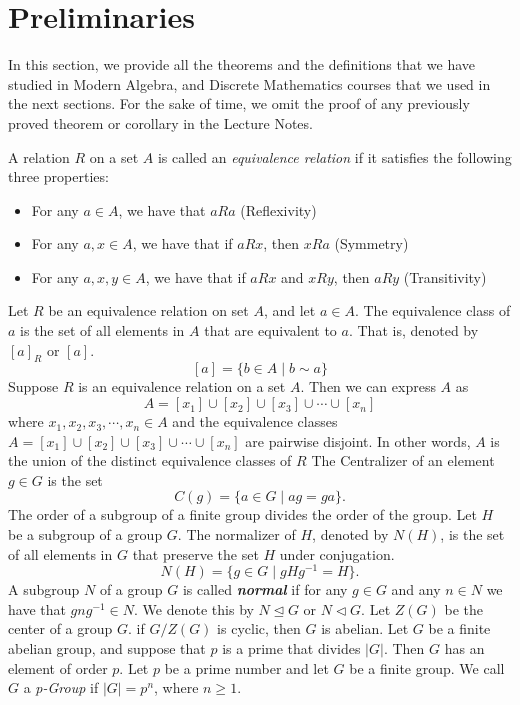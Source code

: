 \documentclass[a4paper,12pt]{article}
\begin{document}
\section{Preliminaries}
In this section, we provide all the theorems and the definitions that we have studied in Modern Algebra, and Discrete Mathematics courses that we used in the next sections. For the sake of time, we omit the proof of any previously proved theorem or corollary in the Lecture Notes.
{
    A relation $R$ on a set $A$ is called an \textit{equivalence relation} if it satisfies the following three properties:
    \begin{itemize}
        \item For any $a \in A$, we have that $aRa$ (Reflexivity)
        \item For any $a,x \in A$, we have that if $aRx$, then $xRa$ (Symmetry)
        \item For any $a,x,y \in A$, we have that if $aRx$ and $xRy$, then $aRy$ (Transitivity)
    \end{itemize}
}
{
    Let $R$ be an equivalence relation on set $A$, and let $a \in A$. The equivalence class of $a$ is the set of all elements in $A$ that are equivalent to $a.$ That is, denoted by $[a]_R$ or $[a].$
    \[[a]=\{b \in A \mid b \sim a\}\]
}
{
    Suppose $R$ is an equivalence relation on a set $A$. Then we can express $A$ as
    \[A=[x_1]\cup [x_2]\cup [x_3] \cup \cdots \cup [x_n]\]
    where $x_1,x_2,x_3,\cdots,x_n \in A$ and the equivalence classes $A=[x_1]\cup [x_2]\cup [x_3] \cup \cdots \cup [x_n]$ are pairwise disjoint. In other words, $A$ is the union of the distinct equivalence classes of $R$
}
{The Centralizer of an element $g \in G$ is the set $$C(g)=\{a \in G \mid ag=ga\}.$$}
{
    The order of a subgroup of a finite group divides the order of the group.
}
{
    Let $H$ be a subgroup of a group $G$. The normalizer of $H$, denoted by $N(H)$, is the set of all elements in $G$ that preserve the set $H$ under conjugation.
    $$N(H)=\{g \in G \mid gHg^{-1}=H\}.$$
}
{
    A subgroup $N$ of a group $G$ is called \textit{\textbf{normal}} if for any $g \in G$ and any $n \in N$ we have that $gng^{-1}\in N.$ We denote this by $N \trianglelefteq G$ or $N \triangleleft G.$
}
{
    Let $Z(G)$ be the center of a group $G.$ if $G/Z(G)$ is cyclic, then $G$ is abelian.
}
{
    Let $G$ be a finite abelian group, and suppose that $p$ is a prime that divides $|G|$.
Then $G$ has an element of order $p$.
}
{
    Let $p$ be a prime number and let $G$ be a finite group. We call $G$ a \textit{p-Group} if $|G|=p^n$, where $n \ge 1.$
}
\end{document}
